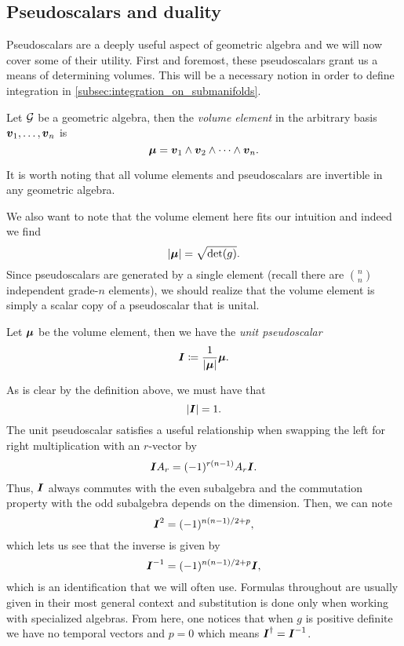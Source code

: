 \subsection{Pseudoscalars and duality}
\label{subsubsec:duality_and_pseudoscalars}

Pseudoscalars are a deeply useful aspect of geometric algebra and we will now cover some of their utility. First and foremost, these pseudoscalars grant us a means of determining volumes. This will be a necessary notion in order to define integration in \cref{subsec:integration_on_submanifolds}.
\begin{definition}
Let $\mathcal{G}$ be a geometric algebra, then the \emph{volume element} in the arbitrary basis $\boldsymbol{v}_1,\dots,\boldsymbol{v}_n$ is 
\begin{equation}
\boldsymbol{\mu}=\boldsymbol{v}_1 \wedge \boldsymbol{v}_2 \wedge \cdots \wedge \boldsymbol{v}_n.
\end{equation}
\end{definition}
It is worth noting that all volume elements and pseudoscalars are invertible in any geometric algebra. 

We also want to note that the volume element here fits our intuition and indeed we find
\begin{equation}
\label{eq:pseudoscalar_norm}
|\boldsymbol{\mu}| = \sqrt{\det(g)}.
\end{equation}
Since pseudoscalars are generated by a single element (recall there are ${n \choose n}$ independent grade-$n$ elements), we should realize that the volume element is simply a scalar copy of a pseudoscalar that is unital.
\begin{definition}
Let $\boldsymbol{\mu}$ be the volume element, then we have the \emph{unit pseudoscalar}
\begin{equation}
\boldsymbol{I} \coloneqq \frac{1}{|\boldsymbol{\mu}|} \boldsymbol{\mu}.
\end{equation}
\end{definition}
As is clear by the definition above, we must have that
\begin{equation}
|\boldsymbol{I}| = 1.
\end{equation}
The unit pseudoscalar satisfies a useful relationship when swapping the left for right multiplication with an $r$-vector by
\begin{equation}
\boldsymbol{I} A_r = (-1)^{r(n-1)} A_r \boldsymbol{I}.
\end{equation}
Thus, $\boldsymbol{I}$ always commutes with the even subalgebra and the commutation property with the odd subalgebra depends on the dimension. Then, we can note
\begin{equation}
\boldsymbol{I}^2 = (-1)^{n(n-1)/2+p},
\end{equation}
which lets us see that the inverse is given by
\begin{equation}
\boldsymbol{I}^{-1} = (-1)^{n(n-1)/2+p} \boldsymbol{I},
\end{equation}
which is an identification that we will often use. Formulas throughout are usually given in their most general context and substitution is done only when working with specialized algebras. From here, one notices that when $g$ is positive definite we have no temporal vectors and $p=0$ which means $\boldsymbol{I}^\dagger = \boldsymbol{I}^{-1}$.

